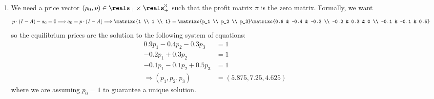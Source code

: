 \documentclass[10pt]{article}
\begin{document}
\begin{enumerate}
	\item We need a price vector $(p_0,p) \in \reals_+ \times \reals^3_+$ such that the profit matrix $\pi$ is the zero matrix. Formally, we want \[p \cdot (I-A) - a_0 = 0 \Longrightarrow a_0 = p\cdot(I-A) \Longrightarrow \matrixc{1 \\ 1 \\ 1} = \matrixc{p_1 \\ p_2 \\ p_3} \matrixc{0.9 & -0.4 & -0.3 \\ -0.2 & 0.3 & 0 \\ -0.1 & -0.1 & 0.5}\]so the equilibrium prices are the solution to the following system of equations: \begin{align*} 0.9p_1 - 0.4p_2 - 0.3p_3 &= 1 \\ -0.2p_1 + 0.3p_2 &= 1 \\ -0.1p_1 - 0.1p_2 + 0.5p_3 &= 1 \\\Longrightarrow (p_1,p_2,p_3) &= (5.875,7.25,4.625) \end{align*}where we are assuming $p_0 = 1$ to guarantee a unique solution.

\end{enumerate}
\end{document}
